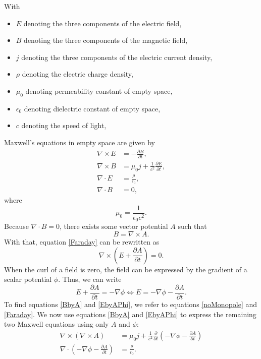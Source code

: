 \documentclass[prb,preprint]{revtex4-1}
\begin{document}
With
\begin{itemize}
  \item $E$ denoting the three components of the electric field,
  \item $B$ denoting the three components of the magnetic field,
  \item $j$ denoting the three components of the electric current density,
  \item $\rho$ denoting the electric charge density,
  \item $\mu_0$ denoting permeability constant of empty space,
  \item $\epsilon_0$ denoting dielectric constant of empty space,
  \item $c$ denoting the speed of light,
\end{itemize}
Maxwell's equations in empty space are given by
\begin{align}
\nabla \times E &= - \frac{\partial B}{\partial t}, \label{Faraday} \\
\nabla \times B &= \mu_0 j +  \frac{1}{c^2} \frac{\partial E}{\partial t}, \\
\nabla \cdot E &= \frac{\rho}{\epsilon_0}, \\
\nabla \cdot B &= 0, \label{noMonopole}
\end{align}
where
\begin{equation}
\mu_0 = \frac{1}{\epsilon_0 c^2}.
\end{equation}
Because $\nabla \cdot B = 0$, there exists some vector potential $A$ such that
\begin{equation} \label{BbyA}
B = \nabla \times A.
\end{equation}
With that, equation \eqref{Faraday} can be rewritten as
\begin{equation}
\nabla \times \left( E + \frac{\partial A}{\partial t} \right) = 0.
\end{equation}
When the curl of a field is zero, the field can be expressed by the gradient of a scalar potential $\phi$. Thus, we can write
\begin{equation} \label{EbyAPhi}
E + \frac{\partial A}{\partial t} = - \nabla \phi
\iff
E = - \nabla \phi - \frac{\partial A}{\partial t}.
\end{equation}
To find equations \eqref{BbyA} and \eqref{EbyAPhi}, we refer to equations \eqref{noMonopole} and \eqref{Faraday}.
We now use equations \eqref{BbyA} and \eqref{EbyAPhi} to express the remaining two Maxwell equations using only $A$ and $\phi$:
\begin{align}
\nabla \times ( \nabla \times A) &= \mu_0 j + \frac{1}{c^2} \frac{\partial}{\partial t} \left(- \nabla \phi - \frac{\partial A}{\partial t} \right) \label{MaxwellAPhi1} \\
\nabla \cdot \left( -\nabla \phi - \frac{\partial A}{\partial t} \right) &= \frac{\rho}{\epsilon_0} . \label{MaxwellAPhi2}
\end{align}
\end{document}

